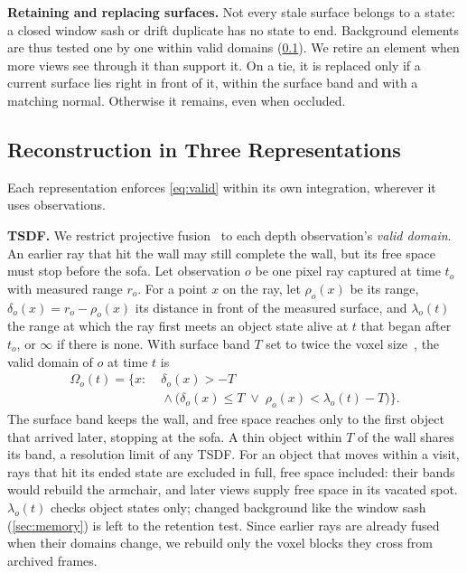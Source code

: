 \documentclass[10pt,twocolumn,letterpaper]{article}
\begin{document}
\vspace{0mm}\noindent\textbf{Retaining and replacing surfaces.}\label{sec:memory}
Not every stale surface belongs to a state: a closed window sash or drift duplicate has no state to end. Background
elements are thus tested one by one within valid domains (\cref{sec:representations}). We retire an element when more views see through it than support it. On a tie, it is replaced only if a current surface lies right in front of it, within the surface band and with a matching normal. Otherwise it remains, even when occluded.

\subsection{Reconstruction in Three Representations}
\label{sec:representations}

Each representation enforces \cref{eq:valid} within its own integration, wherever it uses observations.

\vspace{0mm}\noindent\textbf{TSDF.}
We restrict projective fusion~\cite{10.1145/237170.237269,6162880} to each depth observation's \emph{valid
domain}. An earlier ray that hit the wall may still complete the wall, but its free space must stop before the
sofa. Let observation $o$ be one pixel ray
captured at time $t_o$ with measured range $r_o$. For a point $x$ on the ray, let $\rho_o(x)$ be its range,
$\delta_o(x)=r_o-\rho_o(x)$ its distance in front of the measured surface, and $\lambda_o(t)$ the range at which the
ray first meets an object state alive at $t$ that began after $t_o$, or $\infty$ if there is none. With surface band $T$
set to twice the voxel size~\cite{9811877}, the valid domain of $o$ at time $t$ is
\begin{equation}
\begin{aligned}
\Omega_o(t)=\{x:\;&\delta_o(x)>-T\\
&{}\land\bigl(\delta_o(x)\leq T
\;\lor\;\rho_o(x)<\lambda_o(t)-T\bigr)\}.
\end{aligned}
\label{eq:domain}
\end{equation}
The surface band keeps the wall, and free space reaches only to the first object that arrived later, stopping at the
sofa. A thin object within $T$ of the wall shares its band, a resolution limit of any TSDF. For an object that moves within a visit, rays that hit its ended state are excluded in full, free space included: their bands would rebuild the armchair,
and later views supply free space in its vacated spot. $\lambda_o(t)$ checks object states only; changed background like
the window sash (\cref{sec:memory}) is left to the retention test. Since earlier rays are already fused when their domains change, we rebuild only the voxel blocks they cross from archived frames.
\end{document}

